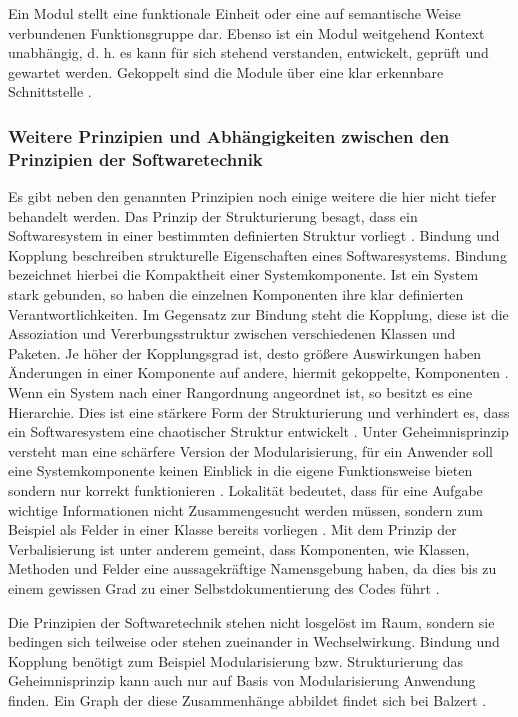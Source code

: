 \documentclass[12pt,oneside,a4paper,parskip]{scrbook}
\begin{document}
Ein Modul stellt eine funktionale Einheit oder eine auf semantische Weise verbundenen Funktionsgruppe dar. Ebenso ist ein Modul weitgehend Kontext unabhängig, d. h. es kann für sich stehend verstanden, entwickelt, geprüft und gewartet werden. Gekoppelt sind die Module über eine klar erkennbare Schnittstelle \cite[S. 41]{balzert2009a}.

\subsubsection{Weitere Prinzipien und Abhängigkeiten zwischen den Prinzipien der Softwaretechnik}

Es gibt neben den genannten Prinzipien noch einige weitere die hier nicht tiefer behandelt werden. Das Prinzip der Strukturierung besagt, dass ein Softwaresystem in einer bestimmten definierten Struktur vorliegt \cite[S. 34ff.]{balzert2009a}. Bindung und Kopplung beschreiben strukturelle Eigenschaften eines Softwaresystems. Bindung bezeichnet hierbei die Kompaktheit einer Systemkomponente. Ist ein System stark gebunden, so haben die einzelnen Komponenten ihre klar definierten Verantwortlichkeiten. Im Gegensatz zur Bindung steht die Kopplung, diese ist die Assoziation und Vererbungsstruktur zwischen verschiedenen Klassen und Paketen. Je höher der Kopplungsgrad ist, desto größere Auswirkungen haben Änderungen in einer Komponente auf andere, hiermit gekoppelte, Komponenten \cite[S. 37f.]{balzert2009a}. Wenn ein System nach einer Rangordnung angeordnet ist, so besitzt es eine Hierarchie. Dies ist eine stärkere Form der Strukturierung und verhindert es, dass ein Softwaresystem eine chaotischer Struktur entwickelt \cite[S. 39ff.]{balzert2009a}. Unter Geheimnisprinzip versteht man eine schärfere Version der Modularisierung, für ein Anwender soll eine Systemkomponente keinen Einblick in die eigene Funktionsweise bieten sondern nur korrekt funktionieren \cite[S. 42ff.]{balzert2009a}. Lokalität bedeutet, dass für eine Aufgabe wichtige Informationen nicht Zusammengesucht werden müssen, sondern zum Beispiel als Felder in einer Klasse bereits vorliegen \cite[S. 45f.]{balzert2009a}. Mit dem Prinzip der Verbalisierung ist unter anderem gemeint, dass Komponenten, wie Klassen, Methoden und Felder eine aussagekräftige Namensgebung haben, da dies bis zu einem gewissen Grad zu einer Selbstdokumentierung des Codes führt \cite[S. 46ff.]{balzert2009a}.

Die Prinzipien der Softwaretechnik stehen nicht losgelöst im Raum, sondern sie bedingen sich teilweise oder stehen zueinander in Wechselwirkung. Bindung und Kopplung benötigt zum Beispiel Modularisierung bzw. Strukturierung das Geheimnisprinzip kann auch nur auf Basis von Modularisierung Anwendung finden. Ein Graph der diese Zusammenhänge abbildet findet sich bei Balzert \cite[S. 49]{balzert2009a}.
\end{document}
